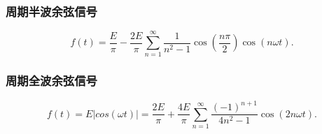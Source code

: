 \subsubsection{周期半波余弦信号}
\srmg
\begin{equation}
    f(t)=\frac{E}{\pi}-\frac{2E}{\pi}\sum_{n=1}^{\infty}\frac{1}{n^2-1}\cos\left(\frac{n\pi}{2}\right)\cos(n\omega t).
\end{equation}

\subsubsection{周期全波余弦信号}
\srmg
\begin{equation}
    f(t)=E|cos(\omega t)|=\frac{2E}{\pi}+\frac{4E}{\pi}\sum_{n=1}^{\infty}\frac{(-1)^{n+1}}{4n^2-1}\cos(2n\omega t).
\end{equation}

